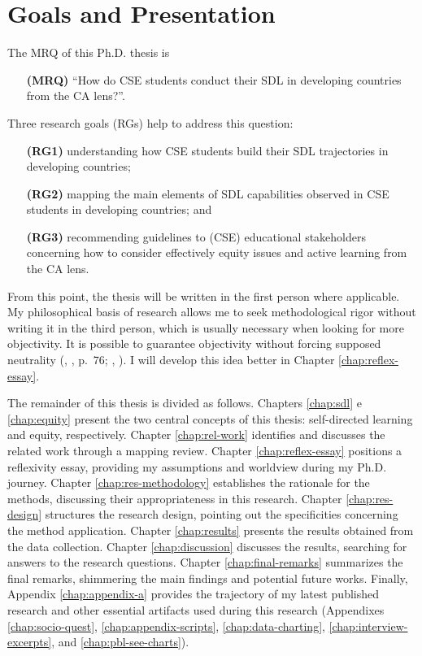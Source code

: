 \section{Goals and Presentation}
\label{intro-sec:goals-pres}

The \gls{MRQ} of this \gls{Ph.D.} thesis is 
\begin{itemize}
    \item[\textbf{(\gls{MRQ})}] ``How do \gls{CSE} students conduct their \gls{SDL} in developing countries from the \gls{CA} lens?''.
\end{itemize}
Three research goals (\glspl{RG}) help to address this question: 
\begin{itemize}
    \item[\textbf{(\gls{RG}1)}] understanding how \gls{CSE} students build their \gls{SDL} trajectories in developing countries; 
    \item[\textbf{(\gls{RG}2)}] mapping the main elements of \gls{SDL} capabilities observed in \gls{CSE} students in developing countries; and
    \item[\textbf{(\gls{RG}3)}] recommending guidelines to (\gls{CSE}) educational stakeholders concerning how to consider effectively equity issues and active learning from the \gls{CA} lens.
\end{itemize} 

From this point, the thesis will be written in the first person where applicable. My philosophical basis of research allows me to seek methodological rigor without writing it in the third person, which is usually necessary when looking for more objectivity. It is possible to guarantee objectivity without forcing supposed neutrality (\citeauthor{saviani:1994}, \citeyear{saviani:1994}, p.~76; \citeauthor{bispojr:2022-educomp}, \citeyear{bispojr:2022-educomp}). I will develop this idea better in Chapter \ref{chap:reflex-essay}.

The remainder of this thesis is divided as follows. Chapters \ref{chap:sdl} e \ref{chap:equity} present the two central concepts of this thesis: self-directed learning and equity, respectively. Chapter \ref{chap:rel-work} identifies and discusses the related work through a mapping review. Chapter \ref{chap:reflex-essay} positions a reflexivity essay, providing my assumptions and worldview during my \gls{Ph.D.} journey. Chapter \ref{chap:res-methodology} establishes the rationale for the methods, discussing their appropriateness in this research. Chapter \ref{chap:res-design} structures the research design, pointing out the specificities concerning the method application. Chapter \ref{chap:results} presents the results obtained from the data collection. Chapter \ref{chap:discussion} discusses the results, searching for answers to the research questions. Chapter \ref{chap:final-remarks} summarizes the final remarks, shimmering the main findings and potential future works. Finally, Appendix \ref{chap:appendix-a} provides the trajectory of my latest published research and other essential artifacts used during this research (Appendixes \ref{chap:socio-quest}, \ref{chap:appendix-scripts}, \ref{chap:data-charting}, \ref{chap:interview-excerpts}, and \ref{chap:pbl-see-charts}).

